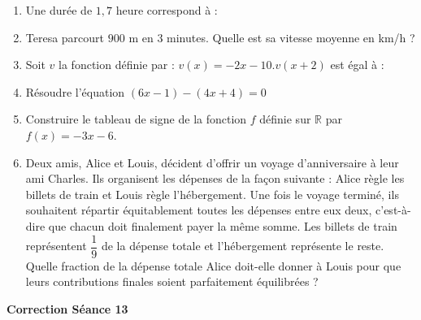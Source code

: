 \documentclass[a4paper,11pt]{article}
\begin{document}
\begin{seanceD}{}
\begin{enumerate}
\begin{enumerate}
	\dotfill
\end{enumerate}


\end{enumerate}
\end{seanceD}



\newpage

\begin{seance}{} %
\begin{enumerate}
\item  Une durée de $1{,}7$ heure correspond à :  \dotfill


\item  Teresa parcourt $900\text{ m}$ en $3$ minutes. Quelle est sa vitesse moyenne en km/h ? \dotfill

\dotfill


\item  Soit $v$ la fonction définie par : $v(x)=-2x-10$.$v(x+2)$ est égal à :  

\dotfill


\item  Résoudre l'équation $(6x-1)-(4x+4)=0$ \dotfill

\dotfill



\item  Construire le tableau de signe de la fonction $f$ définie sur $\mathbb{R}$ par $f(x) = -3x-6$.
\vspace*{4cm}

\item 
 Deux amis, Alice et Louis, décident d'offrir un voyage d'anniversaire à leur ami Charles. 
    Ils organisent les dépenses de la façon suivante : Alice règle les billets de train et Louis règle l'hébergement. Une fois le voyage terminé, ils souhaitent répartir équitablement toutes les dépenses entre eux deux, c'est-à-dire que chacun doit finalement payer la même somme.
Les billets de train représentent $\dfrac{1}{9}$ de la dépense totale et l'hébergement représente le reste.
Quelle fraction de la dépense totale Alice doit-elle donner à Louis pour que leurs contributions finales soient parfaitement équilibrées ?

\dotfill

\dotfill
\end{enumerate}
\end{seance}

\begin{center}

\textbf{\textcolor{Couleur8}{Correction Séance 13}}\\
\vspace{2mm}

\end{center}
\end{document}
